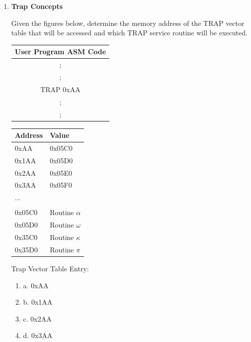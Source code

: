\documentclass{article}
\begin{document}
\begin{enumerate}[label=(\alph*)]
\item \textbf{Trap Concepts}

Given the figures below, determine the memory address of the TRAP vector table that will be accessed and which TRAP service routine will be executed.
\newline

\begin{center}

\begin{tabular}{||c  ||} 
\hline
\multicolumn{1}{|c|}{User Program ASM Code} \\
 \hline
 ;   \\ 
 \hline
;  \\ 
 \hline
 TRAP 0xAA \\
 \hline
 ;\\
 \hline
 ;  \\
 \hline
 
\end{tabular}

\begin{tabular}{|p{3cm} p{3cm} |} 
\hline
 Address & Value  \\ [0.5ex] 
 \hline\hline
 0xAA & 0x05C0 \\ 
 \hline
 0x1AA & 0x05D0 \\
 \hline
 0x2AA & 0x05E0 \\
 \hline
 0x3AA & 0x05F0 \\
 \hline
 ... &  \\ [1ex]
 \hline
  & \\ [1ex]
  \hline
  0x05C0 & Routine $\alpha$ \\
  \hline
  0x05D0 & Routine $\omega$\\
  \hline
  0x35C0 & Routine $\kappa$ \\
  \hline
  0x35D0 & Routine $\pi$ \\
 \hline
 
\end{tabular}



\end{center}

Trap Vector Table Entry:

\begin{enumerate}[label={}]
    \item a. 0xAA
    \item b. 0x1AA
    \item c. 0x2AA
    \item d. 0x3AA

    \end{enumerate}


\end{enumerate}
\end{document}
